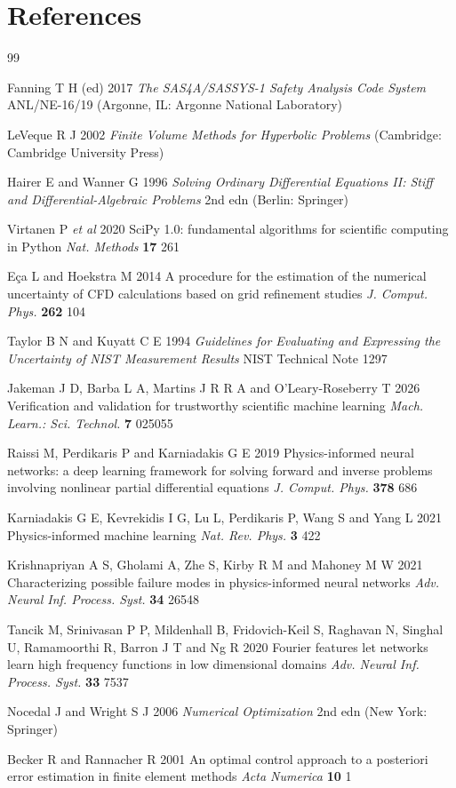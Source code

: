 \documentclass[11pt,a4paper]{article}
\begin{document}
\section*{References}
\begin{thebibliography}{99}

 Fanning T H (ed) 2017 \emph{The SAS4A/SASSYS-1 Safety Analysis Code System}
ANL/NE-16/19 (Argonne, IL: Argonne National Laboratory)

 LeVeque R J 2002 \emph{Finite Volume Methods for Hyperbolic Problems}
(Cambridge: Cambridge University Press)

 Hairer E and Wanner G 1996 \emph{Solving Ordinary Differential Equations
II: Stiff and Differential-Algebraic Problems} 2nd edn (Berlin: Springer)

 Virtanen P \emph{et al} 2020 SciPy 1.0: fundamental algorithms for
scientific computing in Python \emph{Nat. Methods} \textbf{17} 261

 E\c{c}a L and Hoekstra M 2014 A procedure for the estimation of the numerical
uncertainty of CFD calculations based on grid refinement studies
\emph{J. Comput. Phys.} \textbf{262} 104

 Taylor B N and Kuyatt C E 1994 \emph{Guidelines for Evaluating and Expressing
the Uncertainty of NIST Measurement Results} NIST Technical Note 1297

 Jakeman J D, Barba L A, Martins J R R A and O'Leary-Roseberry T 2026
Verification and validation for trustworthy scientific machine learning
\emph{Mach. Learn.: Sci. Technol.} \textbf{7} 025055

 Raissi M, Perdikaris P and Karniadakis G E 2019 Physics-informed neural
networks: a deep learning framework for solving forward and inverse problems involving
nonlinear partial differential equations \emph{J. Comput. Phys.} \textbf{378} 686

 Karniadakis G E, Kevrekidis I G, Lu L, Perdikaris P, Wang S and Yang L
2021 Physics-informed machine learning \emph{Nat. Rev. Phys.} \textbf{3} 422

 Krishnapriyan A S, Gholami A, Zhe S, Kirby R M and Mahoney M W 2021
Characterizing possible failure modes in physics-informed neural networks
\emph{Adv. Neural Inf. Process. Syst.} \textbf{34} 26548

 Tancik M, Srinivasan P P, Mildenhall B, Fridovich-Keil S, Raghavan N,
Singhal U, Ramamoorthi R, Barron J T and Ng R 2020 Fourier features let networks learn high
frequency functions in low dimensional domains \emph{Adv. Neural Inf. Process. Syst.}
\textbf{33} 7537

 Nocedal J and Wright S J 2006 \emph{Numerical Optimization} 2nd edn
(New York: Springer)

 Becker R and Rannacher R 2001 An optimal control approach to a posteriori
error estimation in finite element methods \emph{Acta Numerica} \textbf{10} 1

\end{thebibliography}
\end{document}
